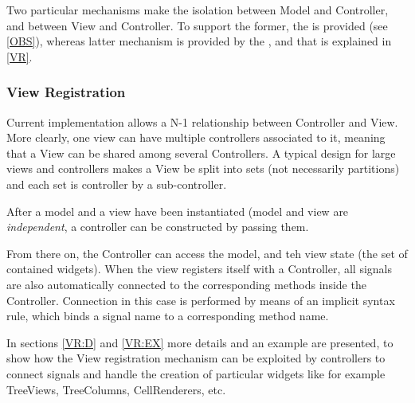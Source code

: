 Two particular mechanisms make the isolation between Model and
Controller, and between View and Controller. To support the former,
the \obs is provided (see \ref{OBS}), whereas latter mechanism is
provided by the \mvc, and that is explained in \ref{VR}.


\subsubsection{\label{VR} View Registration}
Current implementation allows a N-1 relationship between Controller
and View. More clearly, one view can have multiple controllers
associated to it, meaning that a View can be shared among several
Controllers. A typical design for large views and controllers makes a
View be split into sets (not necessarily partitions) and each set is
controller by a sub-controller.

After a model and a view have been instantiated (model and view are
\emph{independent}, a controller can be constructed by passing them. 

From there on, the Controller can access the model, and teh view state
(the set of contained widgets). When the view registers itself with a
Controller, all signals are also automatically connected to the
corresponding methods inside the Controller.  Connection in this case
is performed by means of an implicit syntax rule, which binds a signal
name to a corresponding method name.

In sections \ref{VR:D} and \ref{VR:EX} more details and an example are
presented, to show how the View registration mechanism can be
exploited by controllers to connect signals and handle the creation of
particular widgets like for example TreeViews, TreeColumns,
CellRenderers, etc.
